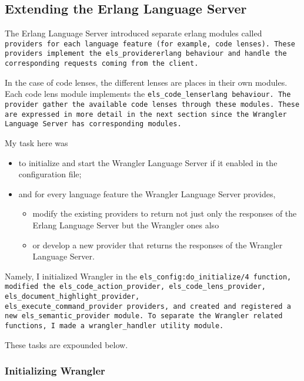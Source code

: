 
\subsection{Extending the Erlang Language Server}

The Erlang Language Server introduced separate erlang modules called \tt provider\rm s for each language feature (for example, code lenses). These providers implement the \tt els\_provider\rm  erlang behaviour and handle the corresponding requests coming from the client. 

In the case of code lenses, the different lenses are places in their own modules. Each code lens module implements the \tt els\_code\_lens\rm  erlang behaviour. The provider gather the available code lenses through these modules. These are expressed in more detail in the next section since the Wrangler Language Server has corresponding modules. \label{src:behaviours} 

My task here was 

\begin{itemize}
    \item to initialize and start the Wrangler Language Server if it enabled in the configuration file;
    \item and for every language feature the Wrangler Language Server provides,
    \begin{itemize}
        \item modify the existing providers to return not just only the responses of the Erlang Language Server but the Wrangler ones also
        \item or develop a new provider that returns the responses of the Wrangler Language Server.
    \end{itemize}
\end{itemize}

Namely, I initialized Wrangler in the \tt els\_config:do\_initialize/4\rm\ function, modified the \tt  els\_code\_action\_provider, els\_code\_lens\_provider, els\_document\_highlight\_provider, els\_execute\_command\_provider\rm\ providers, and created and registered a new \tt els\_semantic\_provider\rm\ module. To separate the Wrangler related functions, I made a \tt wrangler\_handler\rm\ utility module.

These tasks are expounded below.

\subsubsection{Initializing Wrangler}

